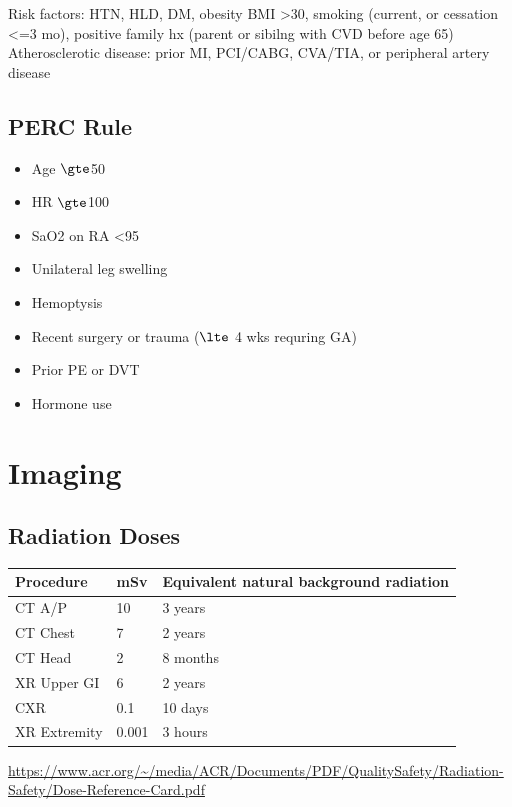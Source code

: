\documentclass[8pt]{extarticle}
\begin{document}
\tiny{Risk factors: HTN, HLD, DM, obesity BMI >30, smoking (current, or cessation <=3 mo), positive family hx (parent or sibilng with CVD before age 65)}\\
\tiny{Atherosclerotic disease: prior MI, PCI/CABG, CVA/TIA, or peripheral artery disease}

\subsection{PERC Rule}
    \begin{itemize}
        \item Age $\gte$50
        \item HR $\gte$100
        \item SaO2 on RA <95%
        \item Unilateral leg swelling
        \item Hemoptysis
        \item Recent surgery or trauma ($\lte$ 4 wks requring GA)
        \item Prior PE or DVT
        \item Hormone use
    \end{itemize}


\section{Imaging}
\subsection{Radiation Doses}

\begin{tabularx}{\linewidth}{|X|X|X|}
\hline
\textbf{Procedure} & \textbf{mSv} & \textbf{Equivalent natural background radiation} \\
\hline
CT A/P & 10 & 3 years  \\
\hline
CT Chest & 7 & 2 years  \\
\hline
CT Head & 2 & 8 months  \\
\hline
XR Upper GI & 6 & 2 years  \\
\hline
CXR & 0.1 & 10 days  \\
\hline
XR Extremity & 0.001 & 3 hours  \\
\hline
\end{tabularx}
\url{https://www.acr.org/~/media/ACR/Documents/PDF/QualitySafety/Radiation-Safety/Dose-Reference-Card.pdf}
\end{document}
